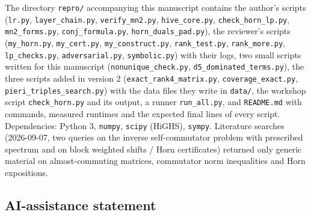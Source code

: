 \documentclass[
  11pt,
  a4paper,
]{article}
\begin{document}
The directory {\small\texttt{repro/\allowbreak{}}} accompanying this manuscript contains the
author's scripts ({\small\texttt{lr.\allowbreak{}py}}, {\small\texttt{layer\_\allowbreak{}chain.\allowbreak{}py}},
{\small\texttt{verify\_\allowbreak{}mn2.\allowbreak{}py}}, {\small\texttt{hive\_\allowbreak{}core.\allowbreak{}py}},
{\small\texttt{check\_\allowbreak{}horn\_\allowbreak{}lp.\allowbreak{}py}}, {\small\texttt{mn2\_\allowbreak{}forms.\allowbreak{}py}},
{\small\texttt{conj\_\allowbreak{}formula.\allowbreak{}py}}, {\small\texttt{horn\_\allowbreak{}duals\_\allowbreak{}pad.\allowbreak{}py}}), the reviewer's
scripts ({\small\texttt{my\_\allowbreak{}horn.\allowbreak{}py}}, {\small\texttt{my\_\allowbreak{}cert.\allowbreak{}py}},
{\small\texttt{my\_\allowbreak{}construct.\allowbreak{}py}}, {\small\texttt{rank\_\allowbreak{}test.\allowbreak{}py}},
{\small\texttt{rank\_\allowbreak{}more.\allowbreak{}py}}, {\small\texttt{lp\_\allowbreak{}checks.\allowbreak{}py}}, {\small\texttt{adversarial.\allowbreak{}py}},
{\small\texttt{symbolic.\allowbreak{}py}}) with their logs, two small scripts written for
this manuscript ({\small\texttt{nonunique\_\allowbreak{}check.\allowbreak{}py}},
{\small\texttt{d5\_\allowbreak{}dominated\_\allowbreak{}terms.\allowbreak{}py}}), the three scripts added in version 2
({\small\texttt{exact\_\allowbreak{}rank4\_\allowbreak{}matrix.\allowbreak{}py}}, {\small\texttt{coverage\_\allowbreak{}exact.\allowbreak{}py}},
{\small\texttt{pieri\_\allowbreak{}triples\_\allowbreak{}search.\allowbreak{}py}}) with the data files they write in
{\small\texttt{data/\allowbreak{}}}, the workshop script {\small\texttt{check\_\allowbreak{}horn.\allowbreak{}py}} and its
output, a runner {\small\texttt{run\_\allowbreak{}all.\allowbreak{}py}}, and {\small\texttt{README.\allowbreak{}md}} with
commands, measured runtimes and the expected final lines of every
script. Dependencies: Python 3, {\small\texttt{numpy}}, {\small\texttt{scipy}} (HiGHS),
{\small\texttt{sympy}}. Literature searches (2026-09-07, two queries on the
inverse self-commutator problem with prescribed spectrum and on block
weighted shifts / Horn certificates) returned only generic material on
almost-commuting matrices, commutator norm inequalities and Horn
expositions.

\subsection{AI-assistance statement}\label{ai-assistance-statement}
\end{document}
